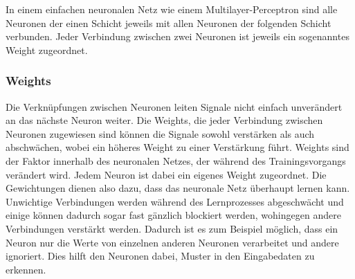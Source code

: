 In einem einfachen neuronalen Netz wie einem Multilayer-Perceptron sind alle Neuronen der einen Schicht jeweils mit allen Neuronen der folgenden Schicht verbunden.
Jeder Verbindung zwischen zwei Neuronen ist jeweils ein sogenanntes Weight zugeordnet.


\subsubsection{Weights}\label{Weights}
  Die Verknüpfungen zwischen Neuronen leiten Signale nicht einfach unverändert an das nächste Neuron weiter.
  Die Weights, die jeder Verbindung zwischen Neuronen zugewiesen sind können die Signale sowohl verstärken als auch abschwächen, wobei ein höheres Weight zu einer Verstärkung führt.
  Weights sind der Faktor innerhalb des neuronalen Netzes, der während des Trainingsvorgangs verändert wird.
  Jedem Neuron ist dabei ein eigenes Weight zugeordnet. Die Gewichtungen dienen also dazu, dass das neuronale Netz überhaupt lernen kann.
  Unwichtige Verbindungen werden während des Lernprozesses abgeschwächt und einige können dadurch sogar fast gänzlich blockiert werden, wohingegen andere Verbindungen verstärkt werden.
  Dadurch ist es zum Beispiel möglich, dass ein Neuron nur die Werte von einzelnen anderen Neuronen verarbeitet und andere ignoriert.
  Dies hilft den Neuronen dabei, Muster in den Eingabedaten zu erkennen. 